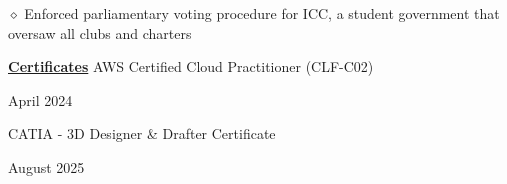 \documentclass [11pt]{article}
\begin{document}
\begin{flushleft}
‭‭\quad\quad\quad$\diamond$ Enforced parliamentary voting procedure for ICC, a student government that oversaw all clubs and charters
%
%
%
%
%
%
\raggedright
\vspace{7}
\underline{\textbf{Certificates}}
\linebreak
AWS Certified Cloud Practitioner (CLF-C02)\begin{minipage}{0.63 \linewidth}\begin{flushright}April 2024\end{flushright}\end{minipage}
\linebreak
CATIA - 3D Designer \& Drafter Certificate\begin{minipage}{0.65 \linewidth}\begin{flushright}August 2025\end{flushright}\end{minipage}

\end{flushleft}
\end{document}
